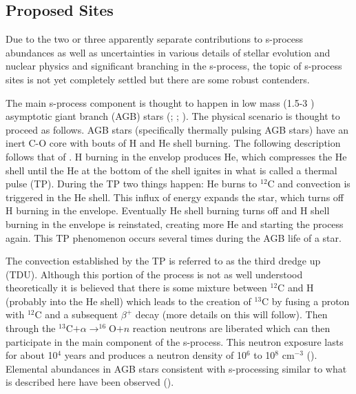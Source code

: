 \subsection{Proposed Sites}

Due to the two or three  apparently separate contributions to s-process abundances
as well as uncertainties in various details of stellar evolution and
nuclear physics and significant branching in the s-process, 
the topic of s-process sites is not yet completely
settled but there are some robust contenders.

The main s-process component is thought to happen in low mass
(1.5-3 \Msol) asymptotic giant branch (AGB) stars
(\citealt{schwarzschild1967}; \citealt{bussoetal1999}; 
\citealt{arlandinietal1999}).
The physical scenario is thought to proceed as follows.  AGB stars
(specifically thermally pulsing AGB stars)
have an inert C-O core with bouts of H and He shell burning.  The
following description follows that of \cite{kappeleretal2011}.  H
burning in the envelop produces He, which compresses the He shell
until the He at the bottom of the shell ignites in what is called a thermal
pulse (TP).  During the TP two things happen: He burns to $^{12}$C and convection
is triggered in the He shell.  This influx of energy expands the star,
which turns off H burning in the envelope.  Eventually He shell
burning turns off and H shell burning in the envelope is reinstated,
creating more He and starting the process again.  This TP phenomenon 
occurs several times during the AGB life of a star.

The convection established by the TP is referred to as the third
dredge up (TDU).  Although this portion of the process is not as well
understood theoretically it is believed that there is some mixture
between $^{12}$C
and H (probably into the He shell) which leads to the creation of
$^{13}$C by fusing a proton 
with $^{12}$C and a subsequent $\beta^+$ decay (more details on this
will follow).  Then through the
$^{13}$C$+ \alpha \rightarrow ^{16}$O$+n$ reaction neutrons are
liberated which can then participate in the main component of the
s-process.  This neutron exposure lasts for about 10$^4$ years and
produces a neutron density of 10$^6$ to 10$^8$ cm$^{-3}$
(\citealt{kappeleretal2011}).   Elemental abundances in AGB stars consistent with
s-processing similar to what is described here have been observed (\citealt{smithlambert1990}).

